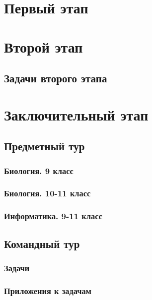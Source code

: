 \documentclass[a4paper,12pt,oneside]{book}
\begin{document}

\setcounter{tocdepth}{1}

\tableofcontents

\part{Первый этап}
\clearpage
 



\part{Второй этап}
\clearpage
\chapter{Задачи второго этапа}



\part{Заключительный этап}

\clearpage
\chapter{Предметный тур}

\section{Биология. 9 класс}


\section{Биология. 10-11 класс}


\section{Информатика. 9-11 класс}


\chapter{Командный тур}

\section{Задачи} 



\section{Приложения к задачам}



\end{document}

